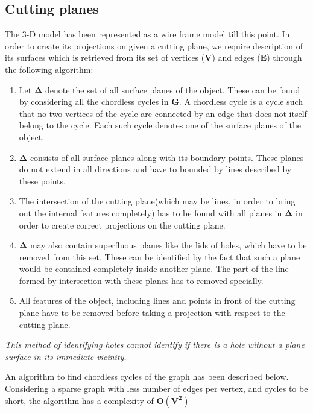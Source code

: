 \documentclass{article}
\begin{document}
\subsection{Cutting planes}
The 3-D model has been represented as a wire frame model till this point. In order to create its projections on given a cutting plane, we require description of its surfaces which is retrieved from its set of vertices ($\boldsymbol{V}$) and edges ($\boldsymbol{E}$) through the following algorithm:
\begin{enumerate}  
\item Let $\boldsymbol{\Delta}$ denote the set of all surface planes of the object. These can be found by considering all the chordless cycles in $\boldsymbol{G}$. A chordless cycle is a cycle such that no two vertices of the cycle are connected by an edge that does not itself belong to the cycle. Each such cycle denotes one of the surface planes of the object.
\item $\boldsymbol{\Delta}$ consists of all surface planes along with its boundary points. These planes do not extend in all directions and have to bounded by lines described by these points.  
\item The intersection of the cutting plane(which may be lines, in order to bring out the internal features completely) has to be found with all planes in $\boldsymbol{\Delta}$ in order to create correct projections on the cutting plane.
\item $\boldsymbol{\Delta}$ may also contain superfluous planes like the lids of holes, which have to be removed from this set. These can be identified by the fact that such a plane would be contained completely inside another plane. The part of the line formed by intersection with these planes has to removed specially. 
\item All features of the object, including lines and points in front of the cutting plane have to be removed before taking a projection with respect to the cutting plane.
\end{enumerate} 
\par
\emph{This method of identifying holes cannot identify if there is a hole without a plane surface in its immediate vicinity.}\\\par
An algorithm to find chordless cycles of the graph has been described below. Considering a sparse graph with less number of edges per vertex, and cycles to be short, the algorithm has a complexity of $\boldsymbol{O(V^2)}$
\end{document}
